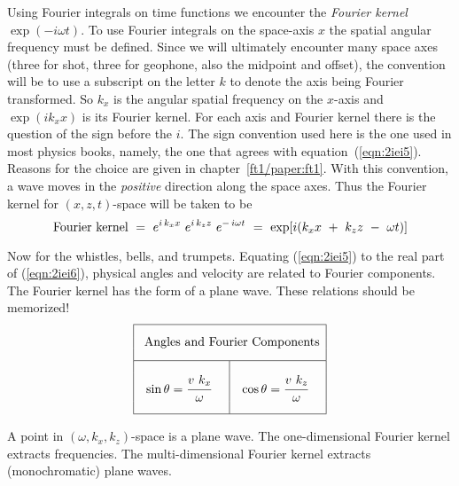 Using Fourier integrals on time functions we encounter the
{\em  Fourier kernel}
$\exp(-i\omega t)$.
To use Fourier integrals on the
space-axis  $x$  the spatial angular frequency must be defined.
Since we will ultimately encounter many space axes
(three for shot, three for geophone, also the midpoint and offset),
the convention will be to use a
subscript on the letter  $k$  to denote the
axis being Fourier transformed.
So  $ k_x $  is the angular spatial frequency on
the $x$-axis and  $ \exp ( i k_x x ) $  is
its Fourier kernel.
For each axis and Fourier kernel there is the question of the 
sign before the $i$.
The sign convention used here is the one used in most physics books,
namely, the one that agrees with equation~(\ref{eqn:2iei5}).
Reasons for the choice are given in chapter~\ref{ft1/paper:ft1}.
With this convention, a wave moves in the
{\em  positive}
direction along the space axes.
Thus the Fourier kernel for  $(x , z , t)$-space
will be taken to be
\begin{equation}
\hbox{Fourier kernel} \ =\  
e^{ i \, k_x x} \  e^{ i \, k_z z} \  e^{ - \, i \omega t} 
\ = \ 
\exp [ i ( k_x x  \ +\  k_z z \ -\  \omega t ) ]
\label{eqn:2iei6}
\end{equation}
\par
Now for the whistles, bells, and trumpets.
Equating (\ref{eqn:2iei5}) to the real part of (\ref{eqn:2iei6}),
physical angles and velocity are related to Fourier components.
The Fourier kernel has the form of a plane wave.
These relations should be memorized!
\begin{equation}
\vbox{\offinterlineskip
  \def\tablerule{\noalign{\hrule}}
  \hrule
  \halign {&\vrule#&
    \strut\quad\hfil#\quad\cr
    height10pt &\multispan3 &\cr
    &\multispan3 {\hfil\rm Angles and Fourier Components}\hfil&\cr
    height10pt &\multispan3 &\cr
    \tablerule
    height10pt &\omit    &&\omit  &\cr
    &$\sin \theta =\displaystyle {\strut v\ k_x \over \omega}$
          &&$\cos \theta = \displaystyle {\strut v\ k_z \over \omega}$ &\cr
   height10pt &\omit    &&\omit  &\cr
  } 
  \hrule}
\label{eqn:sincos}
\end{equation}
\par\noindent
A point in $(\omega,k_x,k_z)$-space is a plane wave.
The one-dimensional Fourier kernel extracts frequencies.
The multi-dimensional Fourier kernel extracts (monochromatic) plane waves.


